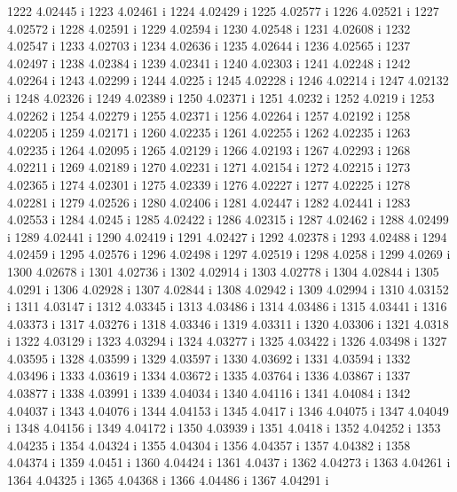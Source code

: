  1222  4.02445  i
 1223  4.02461  i
 1224  4.02429  i
 1225  4.02577  i
 1226  4.02521  i
 1227  4.02572  i
 1228  4.02591  i
 1229  4.02594  i
 1230  4.02548  i
 1231  4.02608  i
 1232  4.02547  i
 1233  4.02703  i
 1234  4.02636  i
 1235  4.02644  i
 1236  4.02565  i
 1237  4.02497  i
 1238  4.02384  i
 1239  4.02341  i
 1240  4.02303  i
 1241  4.02248  i
 1242  4.02264  i
 1243  4.02299  i
 1244  4.0225  i
 1245  4.02228  i
 1246  4.02214  i
 1247  4.02132  i
 1248  4.02326  i
 1249  4.02389  i
 1250  4.02371  i
 1251  4.0232  i
 1252  4.0219  i
 1253  4.02262  i
 1254  4.02279  i
 1255  4.02371  i
 1256  4.02264  i
 1257  4.02192  i
 1258  4.02205  i
 1259  4.02171  i
 1260  4.02235  i
 1261  4.02255  i
 1262  4.02235  i
 1263  4.02235  i
 1264  4.02095  i
 1265  4.02129  i
 1266  4.02193  i
 1267  4.02293  i
 1268  4.02211  i
 1269  4.02189  i
 1270  4.02231  i
 1271  4.02154  i
 1272  4.02215  i
 1273  4.02365  i
 1274  4.02301  i
 1275  4.02339  i
 1276  4.02227  i
 1277  4.02225  i
 1278  4.02281  i
 1279  4.02526  i
 1280  4.02406  i
 1281  4.02447  i
 1282  4.02441  i
 1283  4.02553  i
 1284  4.0245  i
 1285  4.02422  i
 1286  4.02315  i
 1287  4.02462  i
 1288  4.02499  i
 1289  4.02441  i
 1290  4.02419  i
 1291  4.02427  i
 1292  4.02378  i
 1293  4.02488  i
 1294  4.02459  i
 1295  4.02576  i
 1296  4.02498  i
 1297  4.02519  i
 1298  4.0258  i
 1299  4.0269  i
 1300  4.02678  i
 1301  4.02736  i
 1302  4.02914  i
 1303  4.02778  i
 1304  4.02844  i
 1305  4.0291  i
 1306  4.02928  i
 1307  4.02844  i
 1308  4.02942  i
 1309  4.02994  i
 1310  4.03152  i
 1311  4.03147  i
 1312  4.03345  i
 1313  4.03486  i
 1314  4.03486  i
 1315  4.03441  i
 1316  4.03373  i
 1317  4.03276  i
 1318  4.03346  i
 1319  4.03311  i
 1320  4.03306  i
 1321  4.0318  i
 1322  4.03129  i
 1323  4.03294  i
 1324  4.03277  i
 1325  4.03422  i
 1326  4.03498  i
 1327  4.03595  i
 1328  4.03599  i
 1329  4.03597  i
 1330  4.03692  i
 1331  4.03594  i
 1332  4.03496  i
 1333  4.03619  i
 1334  4.03672  i
 1335  4.03764  i
 1336  4.03867  i
 1337  4.03877  i
 1338  4.03991  i
 1339  4.04034  i
 1340  4.04116  i
 1341  4.04084  i
 1342  4.04037  i
 1343  4.04076  i
 1344  4.04153  i
 1345  4.0417  i
 1346  4.04075  i
 1347  4.04049  i
 1348  4.04156  i
 1349  4.04172  i
 1350  4.03939  i
 1351  4.0418  i
 1352  4.04252  i
 1353  4.04235  i
 1354  4.04324  i
 1355  4.04304  i
 1356  4.04357  i
 1357  4.04382  i
 1358  4.04374  i
 1359  4.0451  i
 1360  4.04424  i
 1361  4.0437  i
 1362  4.04273  i
 1363  4.04261  i
 1364  4.04325  i
 1365  4.04368  i
 1366  4.04486  i
 1367  4.04291  i
